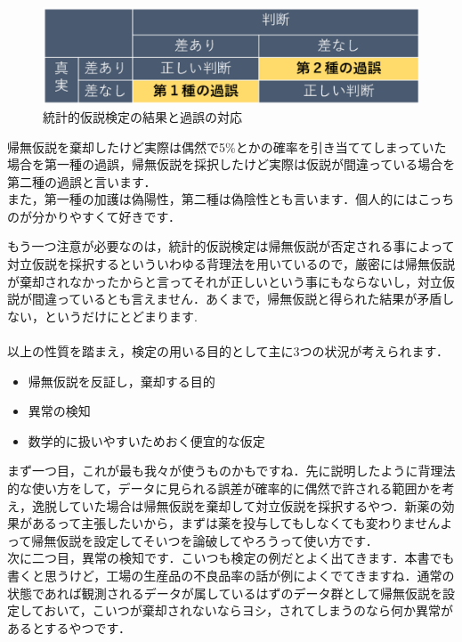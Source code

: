 \documentclass[11pt,a4paper]{ujreport} 	%
\begin{document}
\begin{figure}[H]
  \includegraphics[width=15cm]{../figures/miss.eps}
  \caption{統計的仮説検定の結果と過誤の対応}
\end{figure}

帰無仮説を棄却したけど実際は偶然で5\%とかの確率を引き当ててしまっていた場合を第一種の過誤，帰無仮説を採択したけど実際は仮説が間違っている場合を第二種の過誤と言います．\\

また，第一種の加護は偽陽性，第二種は偽陰性とも言います．個人的にはこっちのが分かりやすくて好きです．

もう一つ注意が必要なのは，統計的仮説検定は帰無仮説が否定される事によって対立仮説を採択するといういわゆる背理法を用いているので，厳密には帰無仮説が棄却されなかったからと言ってそれが正しいという事にもならないし，対立仮説が間違っているとも言えません．あくまで，帰無仮説と得られた結果が矛盾しない，というだけにとどまります. \\\\

以上の性質を踏まえ，検定の用いる目的として主に3つの状況が考えられます．\\

\begin{itemize}
  \item 帰無仮説を反証し，棄却する目的
  \item 異常の検知
  \item 数学的に扱いやすいためおく便宜的な仮定
\end{itemize}

まず一つ目，これが最も我々が使うものかもですね．先に説明したように背理法的な使い方をして，データに見られる誤差が確率的に偶然で許される範囲かを考え，逸脱していた場合は帰無仮説を棄却して対立仮説を採択するやつ．新薬の効果があるって主張したいから，まずは薬を投与してもしなくても変わりませんよって帰無仮説を設定してそいつを論破してやろうって使い方です．\\

次に二つ目，異常の検知です．こいつも検定の例だとよく出てきます．本書でも書くと思うけど，工場の生産品の不良品率の話が例によくでてきますね．通常の状態であれば観測されるデータが属しているはずのデータ群として帰無仮説を設定しておいて，こいつが棄却されないならヨシ，されてしまうのなら何か異常があるとするやつです．\\
\end{document}
